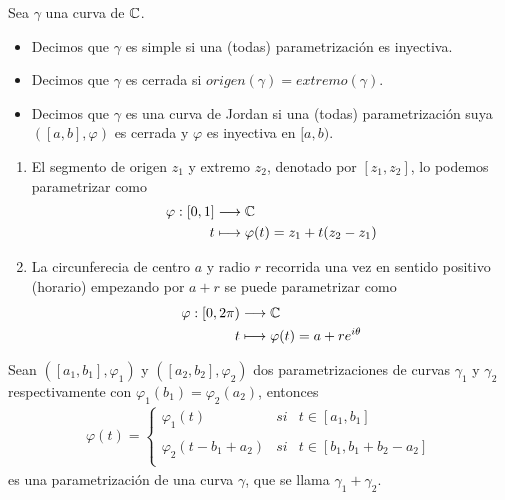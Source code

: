\begin{defi}
    Sea $\gamma$ una curva de $\mathbb{C}$.
    \begin{itemize}
        \item Decimos que $\gamma$ es simple si una (todas) parametrización es inyectiva.
        \item Decimos que $\gamma$ es cerrada si $origen(\gamma) = extremo(\gamma)$.
        \item Decimos que $\gamma$ es una curva de Jordan si una (todas) parametrización suya $([a,b], \varphi)$ es cerrada y $\varphi$ es inyectiva en $[a,b)$.
    \end{itemize}
\end{defi}

\begin{ejemplo}
    \begin{enumerate}
        \item El segmento de origen $z_1$ y extremo $z_2$, denotado por $[z_1,z_2]$, lo podemos parametrizar como
              \begin{align*}
                  \varphi : [0,1] & \longrightarrow \mathbb{C}                        \\
                  t               & \longmapsto \varphi(t) = z_1 + t(z_2 - z_1)
              \end{align*}
        \item La circunferecia de centro $a$ y radio $r$ recorrida una vez en sentido positivo (horario) empezando por $a+r$ se puede parametrizar como
              \begin{align*}
                  \varphi : [0,2\pi) & \longrightarrow \mathbb{C}                      \\
                  t                  & \longmapsto \varphi(t) = a + re^{i\theta}
              \end{align*}
    \end{enumerate}
\end{ejemplo}

\begin{defi}
    Sean $([a_1,b_1],\varphi_1)$ y $([a_2,b_2],\varphi_2)$ dos parametrizaciones de curvas $\gamma_1$ y $\gamma_2$ respectivamente con $\varphi_1(b_1) = \varphi_2(a_2)$, entonces
    \begin{align*}
        \varphi(t) = \left\{ \begin{array}{lcc}
                                 \varphi_1(t) & si & t \in [a_1,b_1] \\
                                 \\ \varphi_2(t-b_1+a_2) &  si &t \in [b_1,b_1 + b_2 - a_2] \\
                             \end{array}
        \right.
    \end{align*}
    es una parametrización de una curva $\gamma$, que se llama $\gamma_1 + \gamma_2$.
\end{defi}

